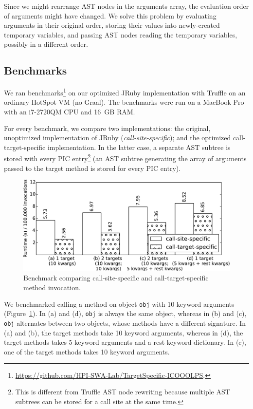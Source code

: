 \documentclass{sigplanconf} %
\begin{document}
Since we might rearrange AST nodes in the arguments array, the evaluation order of arguments might have changed. We solve this problem by evaluating arguments in their original order, storing their values into newly-created temporary variables, and passing AST nodes reading the temporary variables, possibly in a different order.

\subsection{Benchmarks}
We ran benchmarks\footnote{\mbox{\url{https://github.com/HPI-SWA-Lab/TargetSpecific-ICOOOLPS}}.} on our optimized JRuby implementation with Truffle on an ordinary HotSpot VM (no Graal). The benchmarks were run on a MacBook Pro with an i7-2720QM CPU and 16~GB RAM.

For every benchmark, we compare two implementations: the original, unoptimized implementation of JRuby (\emph{call-site-specific}); and the optimized call-target-specific implementation. In the latter case, a separate AST subtree is stored with every PIC entry\footnote{This is different from Truffle AST node rewriting because multiple AST subtrees can be stored for a call site at the same time.} (an AST subtree generating the array of arguments passed to the target method is stored for every PIC entry).

\begin{figure}[!htp]
\includegraphics[width=\linewidth]{resources/benchmark}
\caption{Benchmark comparing call-site-specific and call-target-specific method invocation.}
\label{fig:benchmark}
\end{figure}

We benchmarked calling a method on object \lstinline{obj} with 10 keyword arguments (Figure~\ref{fig:benchmark}). In (a) and (d), \lstinline{obj} is always the same object, whereas in (b) and (c), \lstinline{obj} alternates between two objects, whose methods have a different signature. In (a) and (b), the target methods take 10 keyword arguments, whereas in (d), the target methods takes 5 keyword arguments and a rest keyword dictionary. In (c), one of the target methods takes 10 keyword arguments.
\end{document}
